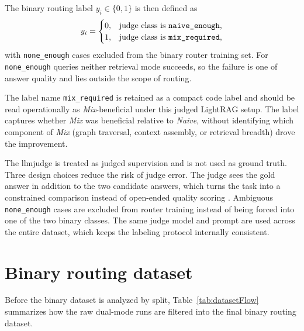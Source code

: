 \documentclass[english, bibtex]{kththesis}               %
\numberwithin{listing}{chapter}
\begin{document}
The binary routing label \(y_i \in \{0, 1\}\) is then defined as
\begin{equation}
\label{eq:routingLabel}
y_i =
\begin{cases}
0, & \text{judge class is \texttt{naive\_enough},}\\
1, & \text{judge class is \texttt{mix\_required},}
\end{cases}
\end{equation}
with \texttt{none\_enough} cases excluded from the binary router training set. For \texttt{none\_enough} queries neither retrieval mode succeeds, so the failure is one of answer quality and lies outside the scope of routing.

The label name \texttt{mix\_required} is retained as a compact code label and should be read operationally as \emph{Mix}-beneficial under this judged LightRAG setup. The label captures whether \emph{Mix} was beneficial relative to \emph{Naive}, without identifying which component of \emph{Mix} (graph traversal, context assembly, or retrieval breadth) drove the improvement.

The \gls{llmjudge} is treated as judged supervision and is not used as ground truth. Three design choices reduce the risk of judge error. The judge sees the gold answer in addition to the two candidate answers, which turns the task into a constrained comparison instead of open-ended quality scoring \cite{zheng2023judge}. Ambiguous \texttt{none\_enough} cases are excluded from router training instead of being forced into one of the two binary classes. The same judge model and prompt are used across the entire dataset, which keeps the labeling protocol internally consistent.

\section{Binary routing dataset}
\label{sec:methodDataset}

Before the binary dataset is analyzed by split, Table~\ref{tab:datasetFlow} summarizes how the raw dual-mode runs are filtered into the final binary routing dataset.
\end{document}
